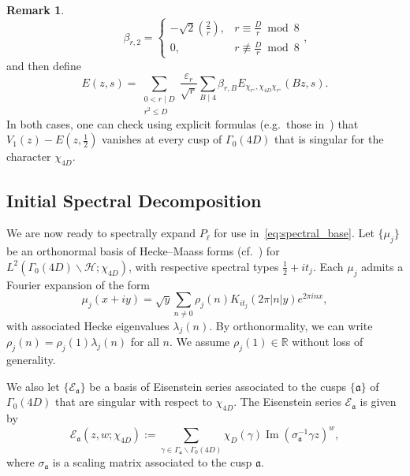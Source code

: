\documentclass[11pt,reqno,oneside]{amsart}
\theoremstyle{plain}
\theoremstyle{definition}
\newtheorem{remark}[theorem]{Remark}
\renewcommand{\Im}{\operatorname{Im}}
\newcommand{\R}{\mathbb{R}}
\newcommand{\calH}{\mathcal{H}}
\newcommand{\chid}{\chi_{4D}}
\begin{document}
\begin{remark}
\begin{equation}
    \qquad
    \beta_{r,2}
    = \begin{cases}
      -\sqrt{2} \left(\frac{2}{r} \right), & r \equiv \frac{D}{r} \bmod 8      \\
      0,                                   & r \not \equiv \frac{D}{r} \bmod 8
    \end{cases},
  \end{equation}
  and then define
  \begin{equation}\label{eq:eisenstein_lincomb}
    E(z,s)
    =
    \sum_{\substack{0 < r \mid D \\ r^2 \le D}}
    \frac{\varepsilon_r}{\sqrt{r}}
    \sum_{B \mid 4} \beta_{r,B} E_{\chi_{r^\diamond}, \chid \chi_{r^\diamond}}(Bz,s).
  \end{equation}
  In both cases, one can check using explicit formulas (e.g.\ those in~\cite{Young}) that $V_1(z) - E(z, \frac{1}{2})$ vanishes at every cusp of
  $\Gamma_0(4D)$ that is singular for the character $\chid$.
\end{remark}

\subsection{Initial Spectral Decomposition}\label{ssec:init_spectral}

We are now ready to spectrally expand $P_\ell$ for use in~\eqref{eq:spectral_base}.
Let $\{ \mu_j \}$ be an orthonormal basis of Hecke--Maass forms  %
(cf.~\cite{Maass}) for $L^2(\Gamma_0(4D) \backslash \calH; \chid)$, with
respective spectral types $\frac{1}{2} + it_j$.
Each $\mu_j$ admits a Fourier expansion of the form
\begin{equation} \label{eq: Fourier expansion of cusp forms}
  \mu_j(x+iy)
  =
  \sqrt{y} \sum_{n \ne 0} \rho_j(n) K_{it_j} (2 \pi |n| y) e^{2 \pi i n x},
\end{equation}
with associated Hecke eigenvalues $\lambda_j(n)$.
By orthonormality, we can write $\rho_j(n) = \rho_j(1) \lambda_j(n)$ for all $n$.
We assume $\rho_j(1) \in \R$ without loss of generality.

We also let $\{ \mathcal{E}_\mathfrak{a} \}$ be a basis of Eisenstein series
associated to the cusps $\{ \mathfrak{a} \}$ of $\Gamma_0(4D)$ that are singular with respect to
$\chid$.
The Eisenstein series $\mathcal{E}_\mathfrak{a}$ is given by
\[
  \mathcal{E}_\mathfrak{a}(z,w; \chid)
  :=
  \sum_{\gamma \in \Gamma_\mathfrak{a} \backslash \Gamma_0(4D)}
  \chi_{D}(\gamma) \Im (\sigma_{\mathfrak{a}}^{-1} \gamma z)^w,
\]
where $\sigma_{\mathfrak{a}}$ is a scaling matrix associated to the cusp $\mathfrak{a}$.
\end{document}
